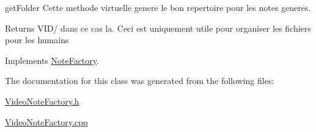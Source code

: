 get\-Folder Cette methode virtuelle genere le bon repertoire pour les notes generes. 

\begin{DoxyReturn}{Returns}
V\-I\-D/ dans ce cas la. Ceci est uniquement utile pour organiser les fichiers pour les humains 
\end{DoxyReturn}


Implements \hyperlink{class_note_factory_a9d4c924038af855a7c4a51455b13ab83}{Note\-Factory}.



The documentation for this class was generated from the following files\-:\begin{DoxyCompactItemize}
\item 
\hyperlink{_video_note_factory_8h}{Video\-Note\-Factory.\-h}\item 
\hyperlink{_video_note_factory_8cpp}{Video\-Note\-Factory.\-cpp}\end{DoxyCompactItemize}
